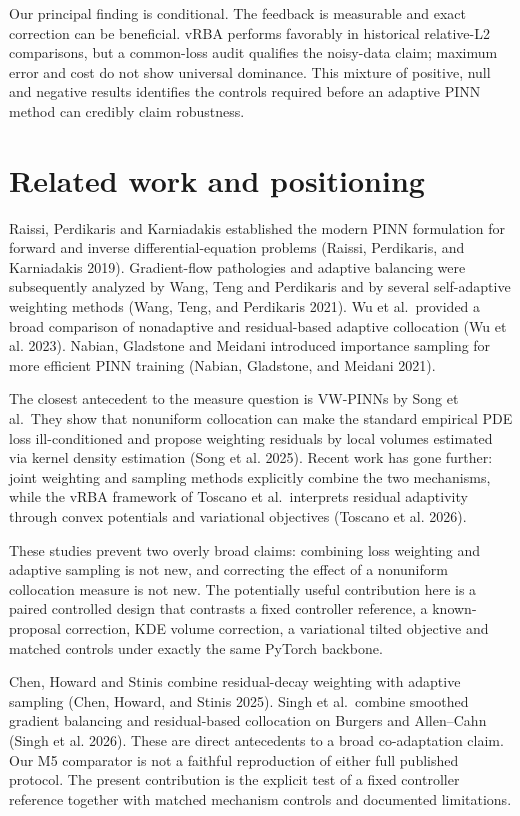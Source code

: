\documentclass[
  11pt,
]{article}
\begin{document}
Our principal finding is conditional. The feedback is measurable and
exact correction can be beneficial. vRBA performs favorably in
historical relative-L2 comparisons, but a common-loss audit qualifies
the noisy-data claim; maximum error and cost do not show universal
dominance. This mixture of positive, null and negative results
identifies the controls required before an adaptive PINN method can
credibly claim robustness.

\hypertarget{related-work-and-positioning}{%
\section{Related work and
positioning}\label{related-work-and-positioning}}

Raissi, Perdikaris and Karniadakis established the modern PINN
formulation for forward and inverse differential-equation problems
(Raissi, Perdikaris, and Karniadakis 2019). Gradient-flow pathologies
and adaptive balancing were subsequently analyzed by Wang, Teng and
Perdikaris and by several self-adaptive weighting methods (Wang, Teng,
and Perdikaris 2021). Wu et al.~provided a broad comparison of
nonadaptive and residual-based adaptive collocation (Wu et al. 2023).
Nabian, Gladstone and Meidani introduced importance sampling for more
efficient PINN training (Nabian, Gladstone, and Meidani 2021).

The closest antecedent to the measure question is VW-PINNs by Song et
al.~They show that nonuniform collocation can make the standard
empirical PDE loss ill-conditioned and propose weighting residuals by
local volumes estimated via kernel density estimation (Song et al.
2025). Recent work has gone further: joint weighting and sampling
methods explicitly combine the two mechanisms, while the vRBA framework
of Toscano et al.~interprets residual adaptivity through convex
potentials and variational objectives (Toscano et al. 2026).

These studies prevent two overly broad claims: combining loss weighting
and adaptive sampling is not new, and correcting the effect of a
nonuniform collocation measure is not new. The potentially useful
contribution here is a paired controlled design that contrasts a fixed
controller reference, a known- proposal correction, KDE volume
correction, a variational tilted objective and matched controls under
exactly the same PyTorch backbone.

Chen, Howard and Stinis combine residual-decay weighting with adaptive
sampling (Chen, Howard, and Stinis 2025). Singh et al.~combine smoothed
gradient balancing and residual-based collocation on Burgers and
Allen--Cahn (Singh et al. 2026). These are direct antecedents to a broad
co-adaptation claim. Our M5 comparator is not a faithful reproduction of
either full published protocol. The present contribution is the explicit
test of a fixed controller reference together with matched mechanism
controls and documented limitations.
\end{document}
